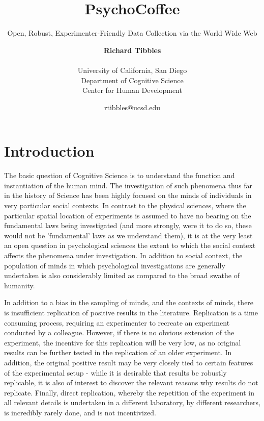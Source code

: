 \documentclass[12pt,a4paper,titlepage]{scrreprt}
\begin{document}
    \title{PsychoCoffee}
    \subtitle{Open, Robust, Experimenter-Friendly Data Collection via the World Wide Web}
    \date{\small{{rtibbles}@ucsd.edu}}
    \author{{\bf Richard Tibbles} \\ \\
                \small{University of California, San Diego} \\
                \small{Department of Cognitive Science} \\
                \small{Center for Human Development}}
    \maketitle
\newpage

\tableofcontents

\newpage

\chapter{Introduction}
    
    The basic question of Cognitive Science is to understand the function and instantiation of the human mind. The investigation of such phenomena thus far in the history of Science has been highly focused on the minds of individuals in very particular social contexts. In contrast to the physical sciences, where the particular spatial location of experiments is assumed to have no bearing on the fundamental laws being investigated (and more strongly, were it to do so, these would not be 'fundamental' laws as we understand them), it is at the very least an open question in psychological sciences the extent to which the social context affects the phenomena under investigation. In addition to social context, the population of minds in which psychological investigations are generally undertaken is also considerably limited as compared to the broad swathe of humanity.

    In addition to a bias in the sampling of minds, and the contexts of minds, there is insufficient replication of positive results in the literature. Replication is a time consuming process, requiring an experimenter to recreate an experiment conducted by a colleague. However, if there is no obvious extension of the experiment, the incentive for this replication will be very low, as no original results can be further tested in the replication of an older experiment. In addition, the original positive result may be very closely tied to certain features of the experimental setup - while it is desirable that results be robustly replicable, it is also of interest to discover the relevant reasons why results do not replicate. Finally, direct replication, whereby the repetition of the experiment in all relevant details is undertaken in a different laboratory, by different researchers, is incredibly rarely done, and is not incentivized.
\end{document}
